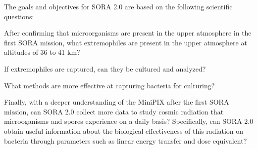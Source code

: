 The goals and objectives for SORA 2.0 are based on the following scientific questions: 
%
\begin{itemize}
	{\indentitem \item After confirming that microorganisms are present in the upper atmosphere in the first SORA mission, what extremophiles are present in the upper atmosphere at altitudes of 36 to 41 km?}
	{\indentitem \item If extremophiles are captured, can they be cultured and analyzed?}
	{\indentitem \item What methods are more effective at capturing bacteria for culturing?} 
	{\indentitem \item Finally, with a deeper understanding of the MiniPIX after the first SORA mission, can SORA 2.0 collect more data to study cosmic radiation that microoganisms and spores experience on a daily basis? Specifically, can SORA 2.0 obtain useful information about the biological effectiveness of this radiation on bacteria through parameters such as linear energy transfer and dose equivalent?}
\end{itemize}
%



